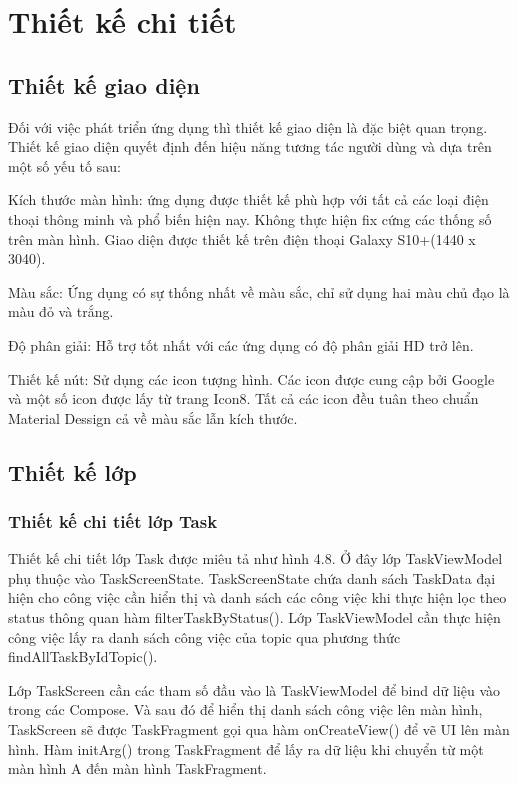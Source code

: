 \documentclass[../Main.tex]{subfiles}
\begin{document}
\section{Thiết kế chi tiết}
\subsection{Thiết kế giao diện}
Đối với việc phát triển ứng dụng thì thiết kế giao diện là đặc biệt quan trọng. Thiết kế giao diện quyết định đến hiệu năng tương tác người dùng và dựa trên một số yếu tố sau:

Kích thước màn hình: ứng dụng được thiết kế phù hợp với tất cả các loại điện thoại thông minh và phổ biến hiện nay. Không thực hiện fix cứng các thống số trên màn hình. Giao diện được thiết kế trên điện thoại Galaxy S10+(1440 x 3040).

Màu sắc: Ứng dụng có sự thống nhất về màu sắc, chỉ sử dụng hai màu chủ đạo là màu đỏ và trắng. 

Độ phân giải: Hỗ trợ tốt nhất với các ứng dụng có độ phân giải HD trở lên. 

Thiết kế nút: Sử dụng các icon tượng hình. Các icon được cung cập bởi Google và một số icon được lấy từ trang Icon8. Tất cả các icon đều tuân theo chuẩn Material Dessign cả về màu sắc lẫn kích thước. 

\subsection{Thiết kế lớp}
\subsubsection{Thiết kế chi tiết lớp Task}
Thiết kế chi tiết lớp Task được miêu tả như hình 4.8. Ở đây lớp TaskViewModel phụ thuộc vào TaskScreenState. TaskScreenState chứa danh sách TaskData đại hiện cho công việc cần hiển thị và danh sách các công việc khi thực hiện lọc theo status thông quan hàm filterTaskByStatus(). Lớp TaskViewModel cần thực hiện công việc lấy ra danh sách công việc của topic qua phương thức findAllTaskByIdTopic().

Lớp TaskScreen cần các tham số đầu vào là TaskViewModel để bind dữ liệu vào trong các Compose. Và sau đó để hiển thị danh sách công việc lên màn hình,  TaskScreen sẽ được TaskFragment gọi qua hàm onCreateView() để vẽ UI lên màn hình. Hàm initArg() trong TaskFragment để lấy ra dữ liệu khi chuyển từ một màn hình A đến màn hình TaskFragment. 
\end{document}
